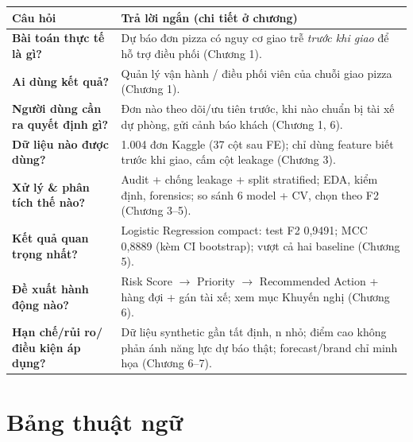 \documentclass[12pt,a4paper,oneside]{report}
\begin{document}
\begin{longtable}{>{\bfseries}p{5.3cm}p{9.0cm}}
\toprule
\textmd{\bfseries Câu hỏi} & \textbf{Trả lời ngắn (chi tiết ở chương)}\\
\midrule
\endhead
Bài toán thực tế là gì? & Dự báo đơn pizza có nguy cơ giao trễ \emph{trước khi
giao} để hỗ trợ điều phối (Chương 1).\\
Ai dùng kết quả? & Quản lý vận hành / điều phối viên của chuỗi giao pizza
(Chương 1).\\
Người dùng cần ra quyết định gì? & Đơn nào theo dõi/ưu tiên trước, khi nào chuẩn
bị tài xế dự phòng, gửi cảnh báo khách (Chương 1, 6).\\
Dữ liệu nào được dùng? & 1.004 đơn Kaggle (37 cột sau FE); chỉ dùng feature
biết trước khi giao, cấm cột leakage (Chương 3).\\
Xử lý \& phân tích thế nào? & Audit + chống leakage + split stratified; EDA,
kiểm định, forensics; so sánh 6 model + CV, chọn theo F2 (Chương 3--5).\\
Kết quả quan trọng nhất? & Logistic Regression compact: test F2 0,9491; MCC
0,8889 (kèm CI bootstrap); vượt cả hai baseline (Chương 5).\\
Đề xuất hành động nào? & Risk Score $\to$ Priority $\to$ Recommended Action +
hàng đợi + gán tài xế; xem mục Khuyến nghị (Chương 6).\\
Hạn chế/rủi ro/điều kiện áp dụng? & Dữ liệu synthetic gần tất định, n nhỏ; điểm
cao không phản ánh năng lực dự báo thật; forecast/brand chỉ minh họa
(Chương 6--7).\\
\bottomrule
\end{longtable}

\chapter*{Bảng thuật ngữ}
\end{document}
